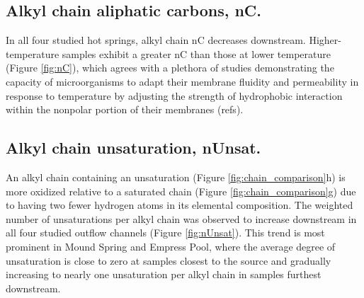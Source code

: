 \subsection{Alkyl chain aliphatic carbons, nC.} In all four studied hot springs, alkyl chain nC decreases downstream. Higher-temperature samples exhibit a greater nC than those at lower temperature (Figure \ref{fig:nC}), which agrees with a plethora of studies demonstrating the capacity of microorganisms to adapt their membrane fluidity and permeability in response to temperature by adjusting the strength of hydrophobic interaction within the nonpolar portion of their membranes (refs).




\subsection{Alkyl chain unsaturation, nUnsat.} An alkyl chain containing an unsaturation (Figure \ref{fig:chain_comparison}h) is more oxidized relative to a saturated chain (Figure \ref{fig:chain_comparison}g) due to having two fewer hydrogen atoms in its elemental composition. The weighted number of unsaturations per alkyl chain was observed to increase downstream in all four studied outflow channels (Figure \ref{fig:nUnsat}). This trend is most prominent in Mound Spring and Empress Pool, where the average degree of unsaturation is close to zero at samples closest to the source and gradually increasing to nearly one unsaturation per alkyl chain in samples furthest downstream.

